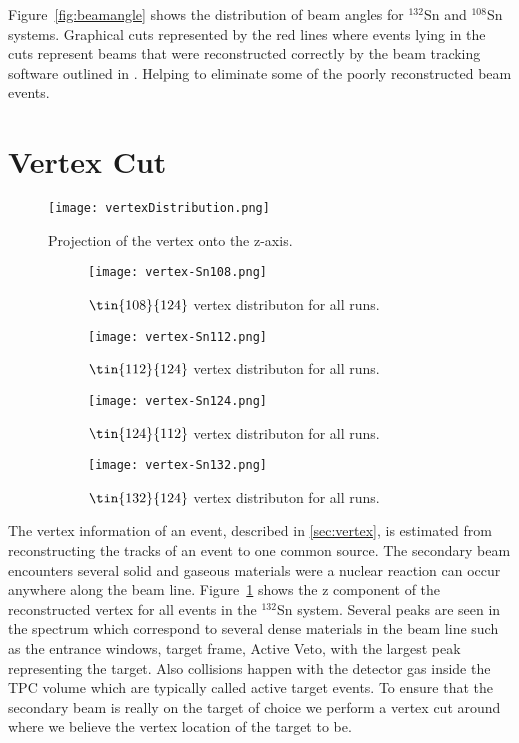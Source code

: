 Figure~\ref{fig:beamangle} shows the distribution of beam angles for ${}^{132}$Sn and ${}^{108}$Sn systems. Graphical cuts represented by the red lines where events lying in the cuts represent beams that were reconstructed correctly by the beam tracking software outlined in \cite{jon}. Helping to eliminate some of the poorly reconstructed beam events. 



\section{Vertex Cut}

\begin{figure}[!htb]
\centering
\texttt{[image: vertexDistribution.png]}
\caption{Projection of the vertex onto the z-axis.}
\label{fig:overviewVertex}
\end{figure}


\begin{figure}[!htb]
\centering
    \begin{subfigure}[t]{\textwidth}
        \centering
        \texttt{[image: vertex-Sn108.png]} 
        \caption{$\tin{108}{124}$ vertex distributon for all runs.} \label{fig:vertex108}
    \end{subfigure}
    \hfill
    \begin{subfigure}[t]{\textwidth}
        \centering
        \texttt{[image: vertex-Sn112.png]} 
        \caption{$\tin{112}{124}$ vertex distributon for all runs.} \label{fig:vertex112}
    \end{subfigure}
    
    \begin{subfigure}[t]{\textwidth}
        \centering
        \texttt{[image: vertex-Sn124.png]} 
        \caption{$\tin{124}{112}$ vertex distributon for all runs.} \label{fig:vertex124}
    \end{subfigure}
    \hfill
    \begin{subfigure}[t]{\textwidth}
        \centering
        \texttt{[image: vertex-Sn132.png]} 
        \caption{$\tin{132}{124}$ vertex distributon for all runs.} \label{fig:vertex132}
    \end{subfigure}
\caption{}
\label{fig:vertexdist}
\end{figure}

The vertex information of an event, described in \ref{sec:vertex}, is estimated from reconstructing the tracks of an event to one common source. The secondary beam encounters several solid and gaseous materials were a nuclear reaction can occur anywhere along the beam line. Figure~\ref{fig:overviewVertex} shows the z component of the reconstructed vertex for all events in the ${}^{132}$Sn system. Several peaks are seen in the spectrum which correspond to several dense materials in the beam line such as the entrance windows, target frame, Active Veto, with the largest peak representing the target. Also collisions happen with the detector gas inside the TPC volume which are typically called active target events. To ensure that the secondary beam is really on the target of choice we perform a vertex cut around where we believe the vertex location of the target to be.
 
